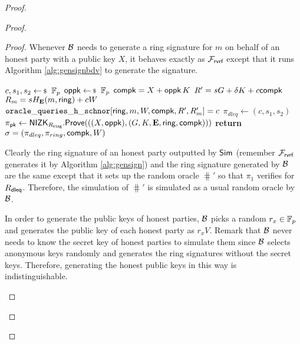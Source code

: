 \begin{proof}
\begin{proof}
\begin{proof}
			Whenever $ \mathcal{B} $ needs to generate a ring signature for $ m $ on behalf of an honest party with a public key $ X $, it behaves exactly as $ \mathcal{F}_{\textsf{rvrf}} $ except that it runs   Algorithm \ref{alg:gensignbdv} to generate the signature. 
			
			
			\begin{algorithm}
				\caption{$\gen_{sign}(\ring,W,X,m)$}
				\label{alg:gensignbdv}	 	
				\begin{algorithmic}[1]
					\State $ c,s_1, s_2 \leftsample \FF_p $
					\State $ \openpk \leftsample \FF_p $
					\State $ \mathsf{compk} =  X + \mathsf{oppk} \, K$
					\State $ R' = sG +\delta K + c\mathsf{compk}$
					\State $ R_m = sH_{\mathbf{E}}(m, \mathsf{ring}) + c W $
					\State $ \mathtt{oracle\_queries\_h\_schnor}[\mathsf{ring},m, W, \mathsf{compk},R',R'_m] = c$						
					\State $ \pi_{dleq} \leftarrow (c,s_1, s_2) $
					\State $ \pi_{\mathsf{pk}} \leftarrow  {\ensuremath{\mathsf{NIZK}}}_{R_{\mathtt{ring}}}.{\mathsf{Prove}}(((X, \mathsf{oppk}),(G,K,{\mathbf{E}},\mathsf{ring}, \mathsf{compk}))) $
					\State \textbf{return} $ \sigma = (\pi_{dleq},\pi_{ring},\mathsf{compk},W) $
				\end{algorithmic}
				
			\end{algorithm}
			
			
			Clearly the ring signature of an honest party outputted by $ \mathsf{Sim} $ (remember $ \mathcal{F}_{\textsf{rvrf}}$ generates it by Algorithm \ref{alg:gensign}) and the ring signature generated by $ \mathcal{B} $ are the same except that it sets up the random oracle $ \hash' $ so that $ \pi_1 $ verifies for $ R_{\mathsf{dleq}} $. Therefore, the simulation of $ \hash' $ is simulated as a usual random oracle by $ \mathcal{B} $.
			
			In order to generate the public keys of honest parties, $ \mathcal{B} $ picks a random $ r_x\in \mathbb{F}_p $ and generates the public key of each honest party as $ r_xV$.
			Remark that $ \mathcal{B}$  never needs to know the secret key of honest parties to simulate them since $ \mathcal{B} $ selects anonymous keys randomly  and generates the ring signatures  without the secret keys. Therefore, generating the honest public keys in this way is indistinguishable. 			
			\begin{figure}
				\centering
				

\end{figure}
\end{proof}
\end{proof}
\end{proof}

